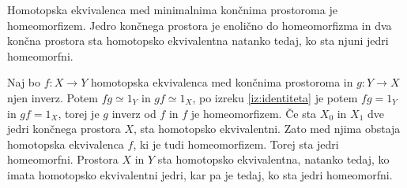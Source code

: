 \documentclass[mat1]{fmfdelo}
\begin{document}
\begin{posledica}
    Homotopska ekvivalenca med minimalnima končnima prostoroma je homeomorfizem. Jedro končnega prostora je enolično do homeomorfizma in dva končna prostora sta homotopsko ekvivalentna natanko tedaj, ko sta njuni jedri homeomorfni.
\end{posledica}

\begin{dokaz}
    Naj bo $f\colon X\rightarrow Y$ homotopska ekvivalenca med 
    končnima prostoroma in $g\colon Y\rightarrow X$ njen inverz. 
    Potem $fg\simeq 1_Y$ in $gf \simeq 1_X$, po izreku 
    \ref{iz:identiteta} je potem $fg = 1_Y$ in $gf = 1_X$,
    torej je $g$ inverz od $f$ in $f$ je homeomorfizem. Če 
    sta $X_0$ in $X_1$ dve jedri končnega prostora $X$,
    sta homotopsko ekvivalentni. Zato med njima obstaja homotopska ekvivalenca $f$, 
    ki je tudi homeomorfizem. Torej sta jedri homeomorfni. 
    Prostora $X$ in $Y$ sta homotopsko ekvivalentna, 
    natanko tedaj, ko imata homotopsko ekvivalentni jedri, 
    kar pa je tedaj, ko sta jedri homeomorfni.
\end{dokaz}
\end{document}
